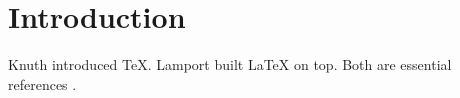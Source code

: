 \documentclass{article}
\begin{document}
\section{Introduction}
Knuth \cite{knuth} introduced \TeX. Lamport \cite{lamport} built \LaTeX{} on top.
Both are essential references \cite{knuth,lamport}.


\end{document}
